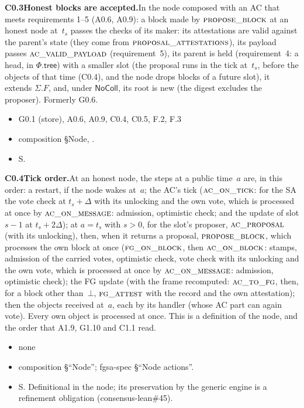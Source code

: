 \documentclass{article}
\newcommand{\Fr}{\Phi}
\newcommand{\fname}[1]{\text{\textsc{#1}}}
\newcommand{\dagnode}[6]{%
\par\medskip\noindent\textbf{#1\enspace #2.}\enspace #3
\begin{itemize}[leftmargin=2.2em,itemsep=0pt,topsep=2pt]
\item[\emph{Uses}] #4
\item[\emph{Evid.}] #5
\item[\emph{Task}] #6
\end{itemize}}
\begin{document}
\dagnode{C0.3}{Honest blocks are accepted}{In the node composed with an AC
that meets requirements 1--5 (A0.6, A0.9): a block made by
$\fname{propose\_block}$ at an honest node at~$t_s$ passes the checks of its
maker: its attestations are valid against the parent's state (they come from
$\fname{proposal\_attestations}$), its payload passes $\fname{ac\_valid\_payload}$
(requirement~5), its parent is held (requirement~4: a head, in
$\Fr.\mathsf{tree}$) with a smaller slot (the proposal runs in the tick at~$t_s$,
before the objects of that time (C0.4), and the node drops blocks of a future
slot), it extends $\Sigma.F$, and, under $\mathsf{NoColl}$, its root is new (the
digest excludes the proposer).  Formerly G0.6.}
{G0.1 (store), A0.6, A0.9, C0.4, C0.5, F.2, F.3}{composition \S Node,
\fname{proposal\_attestations}.}{S.}

\dagnode{C0.4}{Tick order}{At an honest node, the steps at a public time~$a$
are, in this order: a restart, if the node wakes at~$a$; the AC's tick
($\fname{ac\_on\_tick}$: for the SA the vote check at $t_s+\Delta$ with its
unlocking and the own vote, which is processed at once by
$\fname{ac\_on\_message}$: admission, optimistic check; and the update of slot
$s-1$ at $t_s+2\Delta$); at $a=t_s$ with $s>0$, for the slot's proposer,
$\fname{ac\_proposal}$ (with its unlocking), then, when it returns a proposal,
$\fname{propose\_block}$, which processes the own block at once
($\fname{fg\_on\_block}$, then $\fname{ac\_on\_block}$: stamps, admission of the
carried votes, optimistic check, vote check with its unlocking and the own vote,
which is processed at once by $\fname{ac\_on\_message}$: admission, optimistic
check); the FG update (with the frame recomputed: $\fname{ac\_to\_fg}$, then, for a block other
than~$\bot$, $\fname{fg\_attest}$ with the record and the own attestation); then
the objects received at~$a$, each by its handler (whose AC part can again
vote).  Every own object is processed at once.  This is a definition of the
node, and the order that A1.9, G1.10 and C1.1 read.}
{none}{composition \S``Node''; fgsa-spec \S``Node actions''.}{S.  Definitional in
the node; its preservation by the generic engine is a refinement obligation
(consensus-lean\#45).}
\end{document}
